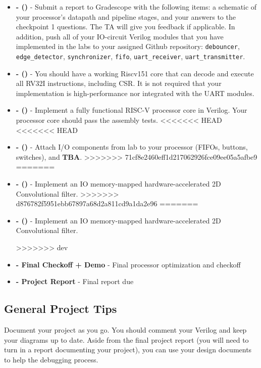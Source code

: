 \documentclass[11pt]{article}
\begin{document}
\begin{itemize}
  \item \textbf{\blockDiagramDueDate \space - \blockDiagramTaskName \space (\blockDiagramTimeAlloted)} - Submit a report to Gradescope with the following items: a schematic of your processor's datapath and pipeline stages, and your answers to the checkpoint 1 questions. The TA will give you feedback if applicable. In addition, push all of your IO-circuit Verilog modules that you have implemented in the labs to your assigned Github repository: \verb|debouncer|, \verb|edge_detector|, \verb|synchronizer|, \verb|fifo|, \verb|uart_receiver|, \verb|uart_transmitter|.
  \item \textbf{\ALUDueDate \space - \ALUTaskName \space (\ALUTimeAlloted)} - You should have a working Riscv151 core that can decode and execute all RV32I instructions, including CSR. It is not required that your implementation is high-performance nor integrated with the UART modules.
  \item \textbf{\baseCPUDueDate \space - \baseCPUTaskName \space (\baseCPUTimeAlloted)} - Implement a fully functional RISC-V processor core in Verilog. Your processor core should pass the assembly tests.
<<<<<<< HEAD
<<<<<<< HEAD
  \item \textbf{\imageDueDate \space - \imageTaskName \space (\imageTimeAlloted)} - Attach I/O components from lab to your processor (FIFOs, buttons, switches), and \textbf{TBA}.
>>>>>>> 71cf8e2460eff1d217062926fce09ee05a5afbe9
=======
  \item \textbf{\imageDueDate \space - \imageTaskName \space (\imageTimeAlloted)} - Implement an IO memory-mapped hardware-accelerated 2D Convolutional filter.
>>>>>>> d876782f5951ebb67897a68d2a811cd9a1da2e96
=======
  

  \item \textbf{\imageDueDate \space - \imageTaskName \space (\imageTimeAlloted)} - Implement an IO memory-mapped hardware-accelerated 2D Convolutional filter.

>>>>>>> dev
  \item \textbf{\finalCheckoffDueDate \space - Final Checkoff + Demo} - Final processor optimization and checkoff
  \item \textbf{\finalReportDueDate \space - Project Report} - Final report due
\end{itemize}

\subsection{General Project Tips}
\label{tips}
Document your project as you go.
You should comment your Verilog and keep your diagrams up to date.
Aside from the final project report (you will need to turn in a report documenting your project), you can use your design documents to help the debugging process.
\end{document}
